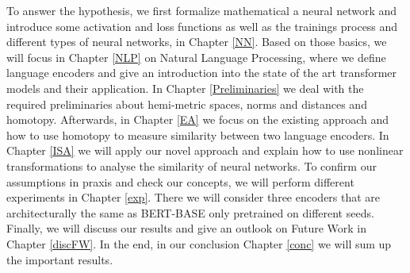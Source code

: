 To answer the hypothesis, we first formalize mathematical a neural network and introduce some activation and loss functions as well as the trainings process and different types of neural networks, in Chapter \ref{NN}.
Based on those basics, we will focus in Chapter \ref{NLP} on Natural Language Processing, where we define language encoders and give an introduction into the state of the art transformer models and their application. 
In Chapter \ref{Preliminaries} we deal with the required preliminaries about hemi-metric spaces, norms and distances and homotopy. 
Afterwards, in Chapter \ref{EA} we focus on the existing approach and how to use homotopy to measure similarity between two language encoders.
In Chapter \ref{ISA} we will apply our novel approach and explain how to use nonlinear transformations to analyse the similarity of neural networks.
To confirm our assumptions in praxis and check our concepts, we will perform different experiments in Chapter \ref{exp}.
There we will consider three encoders that are architecturally the same as {BERT-BASE} \cite{noauthor_bert_nodate} only pretrained on different seeds.
Finally, we will discuss our results and give an outlook on Future Work in Chapter \ref{discFW}.
In the end, in our conclusion Chapter \ref{conc} we will sum up the important results. 